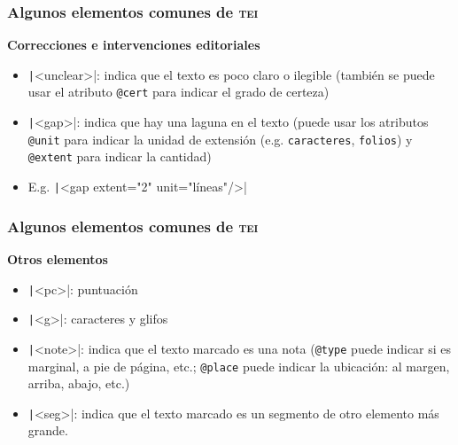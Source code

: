 \documentclass[%
  handout, %
  ]{beamer}
\newcommand*{\azul}[1]{\textcolor{bluenivaca}{#1}}
\newcommand*{\TEI}{\textsc{tei}}
\begin{document}
\begin{frame}
  \frametitle{Algunos elementos comunes de \TEI}

  \textbf{\azul{Correcciones e intervenciones editoriales}}

  \smallskip

  \begin{itemize}
      
    \item \texttt|<unclear>|: indica que el texto es poco claro o ilegible (también se puede usar el atributo \texttt{@cert} para indicar el grado de certeza)
    \item \texttt|<gap>|: indica que hay una laguna en el texto (puede usar los atributos \texttt{@unit} para indicar la unidad de extensión (e.g. \texttt{caracteres}, \texttt{folios}) y \texttt{@extent} para indicar la cantidad)
    \item[] E.g. \texttt|<gap extent="2" unit="líneas"/>|
  \end{itemize}
\end{frame}



\begin{frame}
  \frametitle{Algunos elementos comunes de \TEI}

  \textbf{\azul{Otros elementos}}

  \smallskip

  \begin{itemize}
      
    \item \texttt|<pc>|: puntuación 
    \item \texttt|<g>|: caracteres y glifos
    \item \texttt|<note>|: indica que el texto marcado es una nota (\texttt{@type} puede indicar si es marginal, a pie de página, etc.; \texttt{@place} puede indicar la ubicación: al margen, arriba, abajo, etc.)
    \item \texttt|<seg>|: indica que el texto marcado es un segmento de otro elemento más grande. 
  \end{itemize}
\end{frame}
\end{document}
